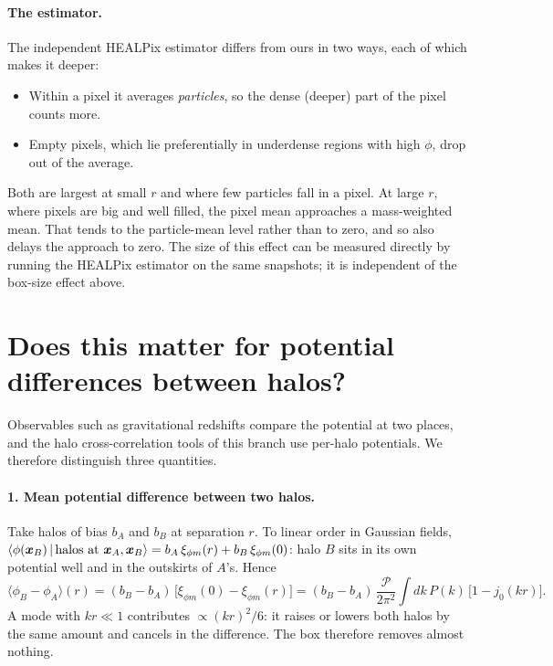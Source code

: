 \documentclass[11pt,a4paper]{article}
\begin{document}
\paragraph{The estimator.}
The independent HEALPix estimator differs from ours in two ways, each of which makes it deeper:
\begin{itemize}
\item Within a pixel it averages \emph{particles}, so the dense (deeper) part of the pixel counts more.
\item Empty pixels, which lie preferentially in underdense regions with high $\phi$, drop out of the average.
\end{itemize}
Both are largest at small $r$ and where few particles fall in a pixel. At large $r$, where pixels are big and well
filled, the pixel mean approaches a mass-weighted mean. That tends to the particle-mean level rather than to zero, and
so also delays the approach to zero. The size of this effect can be measured directly by running the HEALPix estimator
on the same snapshots; it is independent of the box-size effect above.

\section{Does this matter for potential differences between halos?}
\label{sec:diff}

Observables such as gravitational redshifts compare the potential at two places, and the halo cross-correlation tools
of this branch use per-halo potentials. We therefore distinguish three quantities.

\paragraph{1. Mean potential difference between two halos.}
Take halos of bias $b_A$ and $b_B$ at separation $r$. To linear order in Gaussian fields,
$\langle\phi(\boldsymbol x_B)\,|\,{\rm halos\ at\ }\boldsymbol x_A,\boldsymbol x_B\rangle = b_A\,\xi_{\phi m}(r) + b_B\,\xi_{\phi m}(0)$:
halo $B$ sits in its own potential well and in the outskirts of $A$'s. Hence
\begin{equation}
  \langle\phi_B-\phi_A\rangle(r) = (b_B-b_A)\,\big[\xi_{\phi m}(0)-\xi_{\phi m}(r)\big]
  = (b_B-b_A)\,\frac{\mathcal{P}}{2\pi^2}\int\! dk\,P(k)\,\big[1-j_0(kr)\big].
  \label{eq:pair}
\end{equation}
A mode with $kr\ll1$ contributes $\propto(kr)^2/6$: it raises or lowers both halos by the same amount and cancels in
the difference. The box therefore removes almost nothing.
\end{document}
